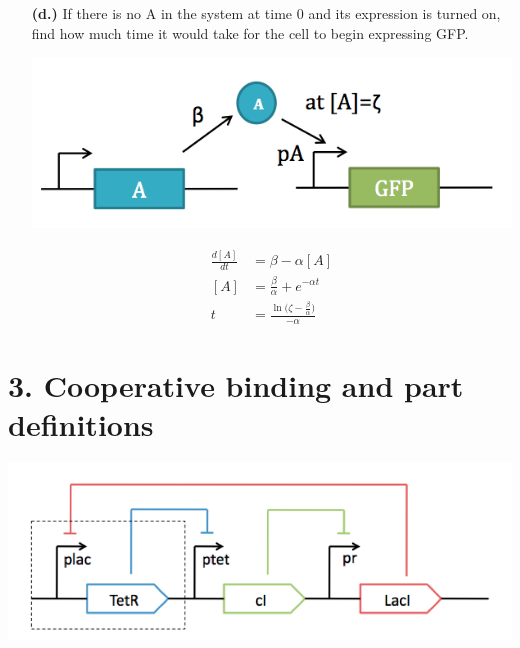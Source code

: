 \documentclass[11pt]{article}
\begin{document}
\begin{itemize}
\item[{\bf (d.)}] If there is no A in the system at time 0 and its expression is turned on, find how much time it would take for the cell to begin expressing GFP.


{
  \centering
  \includegraphics[scale=0.5, trim = 0mm 0mm 7mm 0mm, clip]{ps_2_timebio.png}\par
 }
 
\begin{equation*}
  \begin{align}
  \frac{d[A]}{dt}&=\beta - \alpha[A]\\
  [A] &= \frac{\beta}{\alpha} + e^{-\alpha t}\\
  t &= \frac{\ln{(\zeta-\frac{\beta}{\alpha}})}{-\alpha}
  \end{align}
\end{equation*}

\end{itemize}

\newpage

\section*{3. Cooperative binding and part definitions}

{
  \centering
  \includegraphics[scale=0.5, trim = 0mm 0mm 7mm 0mm, clip]{ps_2_repress.png}\par
 }
\end{document}
